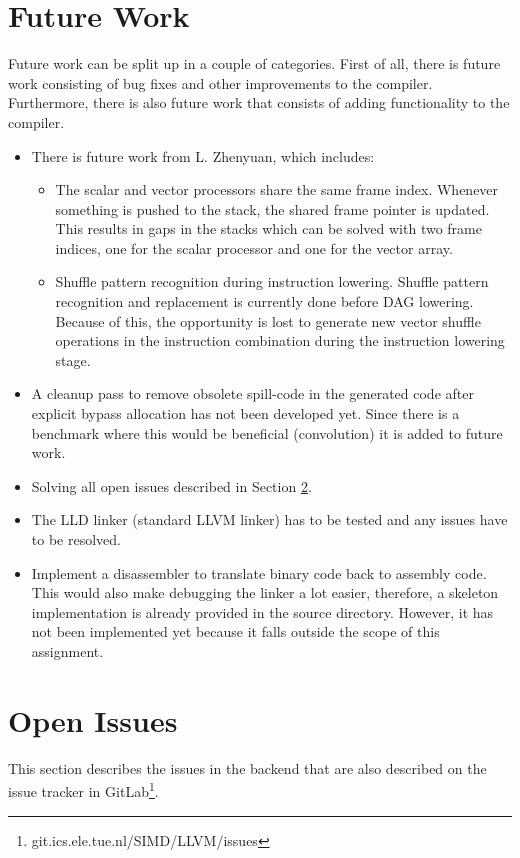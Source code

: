 \section{Future Work}\label{sec:future_work}
Future work can be split up in a couple of categories. First of all, there is future work consisting of bug fixes and other improvements to the compiler. Furthermore, there is also future work that consists of adding functionality to the compiler.
%
\begin{itemize}
    \item There is future work from L. Zhenyuan, which includes:
    \begin{itemize}
        \item The scalar and vector processors share the same frame index. Whenever something is pushed to the stack, the shared frame pointer is updated. This results in gaps in the stacks which can be solved with two frame indices, one for the scalar processor and one for the vector array.
        \item Shuffle pattern recognition during instruction lowering. Shuffle pattern recognition and replacement is currently done before DAG lowering. Because of this, the opportunity is lost to generate new vector shuffle operations in the instruction combination during the instruction lowering stage.
    \end{itemize}
    \item A cleanup pass to remove obsolete spill-code in the generated code after explicit bypass allocation has not been developed yet. Since there is a benchmark where this would be beneficial (convolution) it is added to future work.
    \item Solving all open issues described in Section \ref{sec:issues}.
    \item The LLD linker (standard LLVM linker) has to be tested and any issues have to be resolved.
    \item Implement a disassembler to translate binary code back to assembly code. This would also make debugging the linker a lot easier, therefore, a skeleton implementation is already provided in the source directory. However, it has not been implemented yet because it falls outside the scope of this assignment.
\end{itemize}

\section{Open Issues}\label{sec:issues}
This section describes the issues in the backend that are also described on the issue tracker in GitLab\footnote{git.ics.ele.tue.nl/SIMD/LLVM/issues}.

